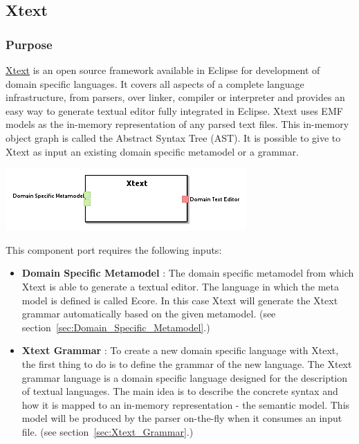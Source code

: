 \documentclass{gemoc} %
\begin{document}
\subsection{Xtext}
\label{sec:Xtext}


\subsubsection{Purpose}
\href{http://www.eclipse.org/Xtext}{Xtext} is an open source framework available in Eclipse for development of domain specific languages.
It covers all aspects of a complete language infrastructure, from parsers, over linker, compiler or interpreter and provides an easy way to generate textual editor fully integrated in Eclipse.
Xtext uses EMF models as the in-memory representation of any parsed text files. This in-memory object graph is called the Abstract Syntax Tree (AST).
It is possible to give to Xtext as input an existing domain specific metamodel or a grammar.

\begin{center}
\includegraphics*[trim=0.0cm 0.0cm 0cm 0.0cm, clip=true]{../images/generated/Generated_Xtext.png}
\end{center}

This component port requires the following inputs:
\begin{itemize}
  \item \textbf{Domain Specific Metamodel} :
The domain specific metamodel from which Xtext is able to generate a textual editor. The language in which the meta model is defined is called Ecore. In this case Xtext will generate the Xtext grammar automatically based on the given metamodel.
(see section~\ref{sec:Domain_Specific_Metamodel}.)
  \item \textbf{Xtext Grammar} :
To create a new domain specific language with Xtext, the first thing to do is to define the grammar of the new language. The Xtext grammar language is a domain specific language designed for the description of textual languages. The main idea is to describe the concrete syntax and how it is mapped to an in-memory representation - the semantic model. This model will be produced by the parser on-the-fly when it consumes an input file.
(see section~\ref{sec:Xtext_Grammar}.)
\end{itemize}
\end{document}

